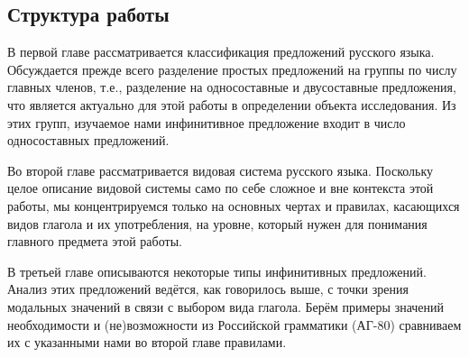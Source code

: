 \subsection{Структура работы}

В первой главе рассматривается классификация предложений русского языка. Обсуждается прежде всего разделение простых предложений на группы по числу главных членов, т.е., разделение на односоставные и двусоставные предложения, что является актуально для этой работы в определении объекта исследования. Из этих групп, изучаемое нами инфинитивное предложение входит в число односоставных предложений.

Во второй главе рассматривается видовая система русского языка. Поскольку целое описание видовой системы само по себе сложное и вне контекста этой работы, мы концентрируемся только на основных чертах и правилах, касающихся видов глагола и их употребления, на уровне, который нужен для понимания главного предмета этой работы. 

В третьей главе описываются некоторые типы инфинитивных предложений. Анализ этих предложений ведётся, как говорилось выше, с точки зрения модальных значений в связи с выбором вида глагола. Берём примеры значений необходимости и (не)возможности из Российской грамматики (АГ-80) сравниваем их с указанными нами во второй главе правилами.

